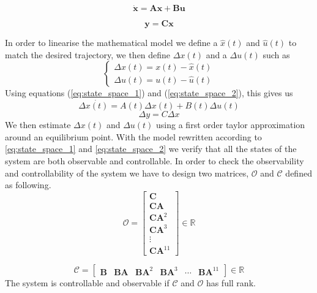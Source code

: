 \documentclass[journal, twoside]{IEEEtran}
\begin{document}
	\begin{equation} \label{eq:state_space_1}
			\bm{\dot x} = \bm{A} \bm{x} + \bm{B} \bm{u}
	\end{equation}
	
	\begin{equation} \label{eq:state_space_2}
	\bm{y} = \bm{C} \bm{x}
	\end{equation}	
	
In order to linearise the mathematical model we define a $\hat{x}(t)$ and $\hat{u}(t)$ to match the desired trajectory, we then define $\Delta x(t)$ and a $\Delta u(t)$ such as
\begin{equation} \label{eq:linearisation}
	\left\lbrace {\begin{array}{c}	
	\Delta x(t) = x(t) - \hat{x}(t) \\
	 \Delta u(t) = u(t) - \hat{u}(t)
	\end{array} }\right.
\end{equation}	 
Using equations (\ref{eq:state_space_1}) and (\ref{eq:state_space_2}), this gives us
\begin{equation} \label{eq:linerstate}
	\Delta \dot{x(t)} = A(t) \Delta x(t) + B(t) \Delta u(t)
\end{equation}	
	\begin{equation} \label{eq:linearstate_2}
		\Delta y = C \Delta x
	\end{equation}
	We then estimate $\Delta x(t)$ and $\Delta u(t)$ using a first order taylor approximation around an equilibrium point.
	With the model rewritten according to \ref{eq:state_space_1} and \ref{eq:state_space_2} we verify that all the states of the system are both observable and controllable. In order to check the observability and controllability of the system we have to design two matrices, $\mathcal{O}$ and $\mathcal{C}$ defined as following.
	\begin{equation}\label{eq:observability}
	\mathcal{O} = 
	\left[ {\begin{array}{c}	
    \bm{C}\\
    \bm{CA}\\
    \bm{CA}^2\\
    \bm{CA}^3\\
    \vdots \\
    \bm{CA}^{11}
	\end{array} } \right] \in 
	\mathbb{R}
	\end{equation}
	
	
	\begin{equation}\label{eq:controlability}
	\mathcal{C} = \left[ {\begin{array}{cccccc}	
    \bm{B} & \bm{BA} & \bm{BA}^2 & \bm{BA}^3 & \cdots & \bm{BA}^{11}
	\end{array} } \right] \in 
	\mathbb{R}
	\end{equation}
The system is controllable and observable if $\mathcal{C}$ and $\mathcal{O}$ has full rank.\\
	
\end{document}
